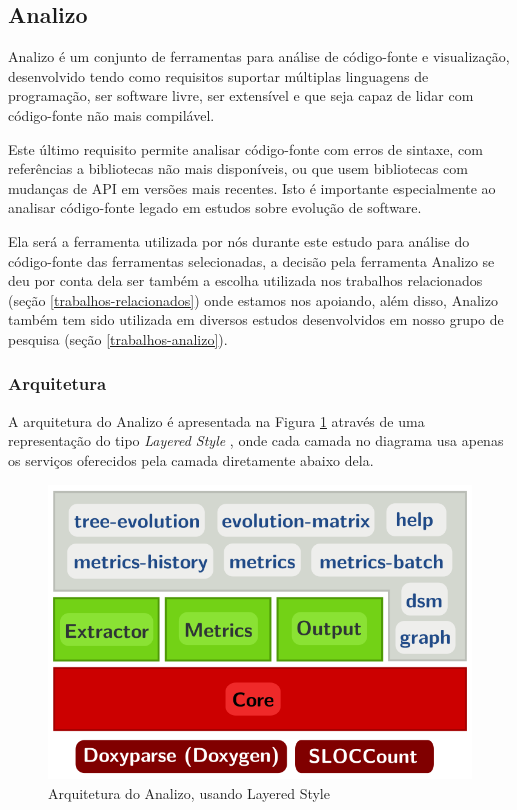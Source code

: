 \subsection{Analizo} \label{analizo}

Analizo é um conjunto de ferramentas para análise de código-fonte e
visualização, desenvolvido tendo como requisitos suportar múltiplas linguagens
de programação, ser software livre, ser extensível e que seja capaz de lidar
com código-fonte não mais compilável.

Este último requisito permite analisar código-fonte com erros de sintaxe, com
referências a bibliotecas não mais disponíveis, ou que usem bibliotecas com
mudanças de API em versões mais recentes. Isto é importante especialmente ao
analisar código-fonte legado em estudos sobre evolução de software.

Ela será a ferramenta utilizada por nós durante este estudo para análise do
código-fonte das ferramentas selecionadas, a decisão pela ferramenta Analizo
se deu por conta dela ser também a escolha utilizada nos trabalhos
relacionados (seção \ref{trabalhos-relacionados}) onde estamos nos apoiando,
além disso, Analizo também tem sido utilizada em diversos estudos
desenvolvidos em nosso grupo de pesquisa (seção \ref{trabalhos-analizo}).

\subsubsection{Arquitetura}

A arquitetura do Analizo é apresentada na Figura \ref{arquitetura-analizo}
através de uma representação do tipo {\it Layered Style} \cite{Clements2002},
onde cada camada no diagrama usa apenas os serviços oferecidos pela camada
diretamente abaixo dela.

\begin{figure}[h]
\center
\includegraphics[scale=0.3]{imagens/analizo-architecture.png}
\caption{Arquitetura do Analizo, usando Layered Style \cite{Clements2002}}
\label{arquitetura-analizo}
\end{figure}

